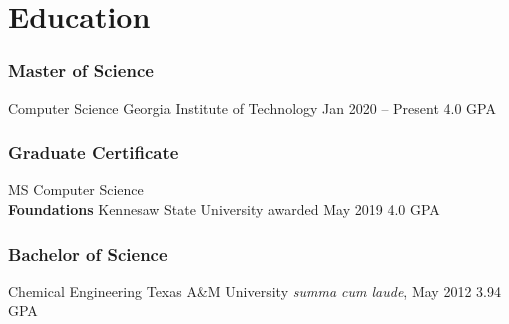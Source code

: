 %
%
%
%
\section{Education}
  \subsubsection{Master of Science} 
  \school%
    {Computer Science}%
    {Georgia Institute of Technology}%
    {Jan 2020 -- Present}%
    {4.0 GPA}
  \subsubsection{Graduate Certificate}
  \school%
    {MS Computer Science \\ \bf{Foundations}}%
    {Kennesaw State University}%
    {awarded May 2019}%
    {4.0 GPA}
  \subsubsection{Bachelor of Science}
  \school%
    {Chemical Engineering}%
    {Texas A\&M University}%
    {\textit{summa cum laude}, May 2012}%
    {3.94 GPA}
%
%
%